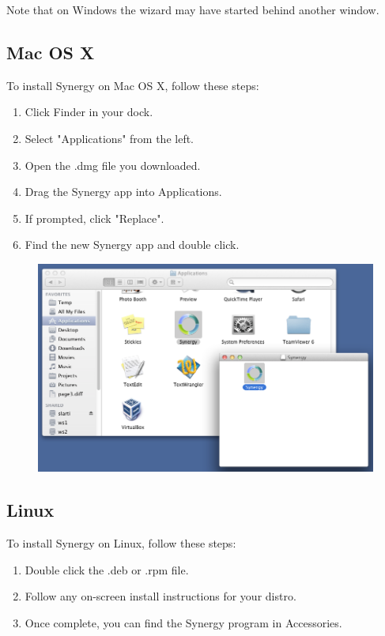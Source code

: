 \wizardhint{}
Note that on Windows the wizard may have started behind another window.

\confighint{}

\subsection{Mac OS X}

To install Synergy on Mac OS X, follow these steps:

\begin{enumerate}
  \item Click Finder in your dock.
  \item Select "Applications" from the left.
  \item Open the .dmg file you downloaded.
  \item Drag the Synergy app into Applications.
  \item If prompted, click "Replace".
  \item Find the new Synergy app and double click.
\end{enumerate}

\begin{figure}[H]
\includegraphics[scale=.65]{graphics/mac-install.png}
\end{figure}

\wizardhint{}

\confighint{}

\subsection{Linux}

To install Synergy on Linux, follow these steps:

\begin{enumerate}
  \item Double click the .deb or .rpm file.
  \item Follow any on-screen install instructions for your distro.
  \item Once complete, you can find the Synergy program in Accessories.
\end{enumerate}

\wizardhint{}

\confighint{}
